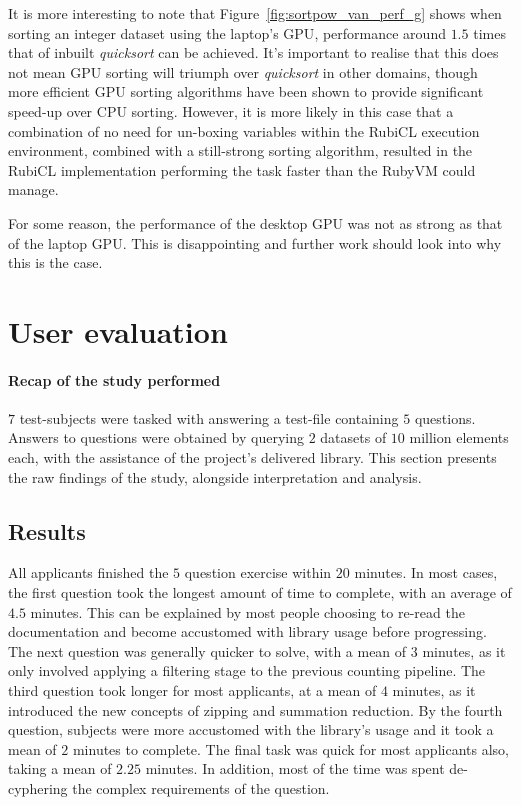 It is more interesting to note that Figure~\ref{fig:sortpow_van_perf_g} shows when sorting an integer dataset using the laptop's \ac{GPU}, performance around $1.5$ times that of inbuilt \emph{quicksort} can be achieved. It's important to realise that this does not mean \ac{GPU} sorting will triumph over \emph{quicksort} in other domains, though more efficient \ac{GPU} sorting algorithms have been shown to provide significant speed-up over \ac{CPU} sorting\cite{sintorn2008fast}. However, it is more likely in this case that a combination of no need for un-boxing variables within the RubiCL execution environment, combined with a still-strong sorting algorithm, resulted in the RubiCL implementation performing the task faster than the RubyVM could manage.

For some reason, the performance of the desktop \ac{GPU} was not as strong as that of the laptop \ac{GPU}. This is disappointing and further work should look into why this is the case.
\section{User evaluation}
\paragraph*{Recap of the study performed}
$7$ test-subjects were tasked with answering a test-file containing $5$ questions. Answers to questions were obtained by querying $2$ datasets of $10$ million elements each, with the assistance of the project's delivered library. This section presents the raw findings of the study, alongside interpretation and analysis.

\subsection{Results}
All applicants finished the $5$ question exercise within $20$ minutes. In most cases, the first question took the longest amount of time to complete, with an average of $4.5$ minutes. This can be explained by most people choosing to re-read the documentation and become accustomed with library usage before progressing. The next question was generally quicker to solve, with a mean of $3$ minutes, as it only involved applying a filtering stage to the previous counting pipeline. The third question took longer for most applicants, at a mean of $4$ minutes, as it introduced the new concepts of zipping and summation reduction. By the fourth question, subjects were more accustomed with the library's usage and it took a mean of $2$ minutes to complete. The final task was quick for most applicants also, taking a mean of $2.25$ minutes. In addition, most of the time was spent de-cyphering the complex requirements of the question.

